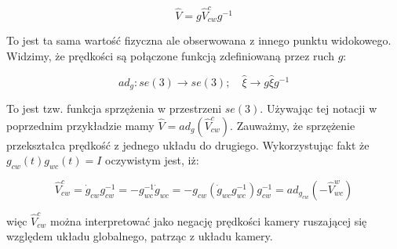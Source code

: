 \documentclass[a4paper,12pt]{article}
\begin{document}
\begin{equation}
\hat{V}=g\hat{V}^c_{cw}g^{-1}
\end{equation}

To jest ta sama wartość fizyczna ale obserwowana z innego punktu widokowego. Widzimy, że prędkości są połączone funkcją zdefiniowaną przez ruch $g$:

\begin{equation}
ad_g : se(3) \rightarrow se(3); \quad \hat{\xi} \rightarrow g\hat{\xi}g^{-1}
\end{equation}

To jest tzw. funkcja sprzężenia w przestrzeni $se(3)$. Używając tej notacji w poprzednim przykładzie mamy $\hat{V} = ad_g(\hat{V}^c_{cw})$. Zauważmy, że sprzężenie przekształca prędkość z jednego układu do drugiego. Wykorzystując fakt że $g_{cw}(t)g_{wc}(t)=I$ oczywistym jest, iż:

\begin{equation}
\hat{V}^c_{cw}=\dot{g}_{cw}g^{-1}_{cw}= -g^{-1}_{wc}\dot{g}_{wc}= -g_{cw}(\dot{g}_{wc}g^{-1}_{wc})g^{-1}_{cw}=ad_{g_{cw}}(-\hat{V}^w_{wc})
\end{equation}

\noindent więc $\hat{V}^c_{cw}$ można interpretować jako negację prędkości kamery ruszającej się względem układu globalnego, patrząc z układu kamery.
\end{document}
